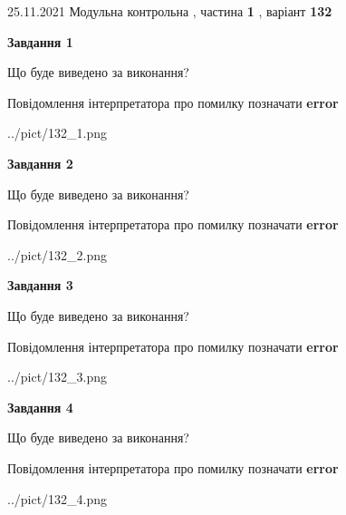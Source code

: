 \documentclass[10pt, ukrainian]{article}
\begin{document}
{25.11.2021 Модульна контрольна , частина \textbf { 1 }, варіант  \No \textbf { 132 }\par}
{
\begin {large}

{\begin {center}\textbf{Завдання 1}\end {center}}\par
Що буде виведено за виконання? \par
Повідомлення інтерпретатора про помилку позначати \textbf{error}

\begin{center}
	{../pict/132_1.png}
\end{center}
\newpage

{\begin {center}\textbf{Завдання 2}\end {center}}\par
Що буде виведено за виконання? \par
Повідомлення інтерпретатора про помилку позначати \textbf{error}

\begin{center}
	{../pict/132_2.png}
\end{center}
\newpage

{\begin {center}\textbf{Завдання 3}\end {center}}\par
Що буде виведено за виконання? \par
Повідомлення інтерпретатора про помилку позначати \textbf{error}

\begin{center}
	{../pict/132_3.png}
\end{center}
\newpage

{\begin {center}\textbf{Завдання 4}\end {center}}\par
Що буде виведено за виконання? \par
Повідомлення інтерпретатора про помилку позначати \textbf{error}

\begin{center}
	{../pict/132_4.png}
\end{center}
\newpage


\end{large}}
\end{document}
